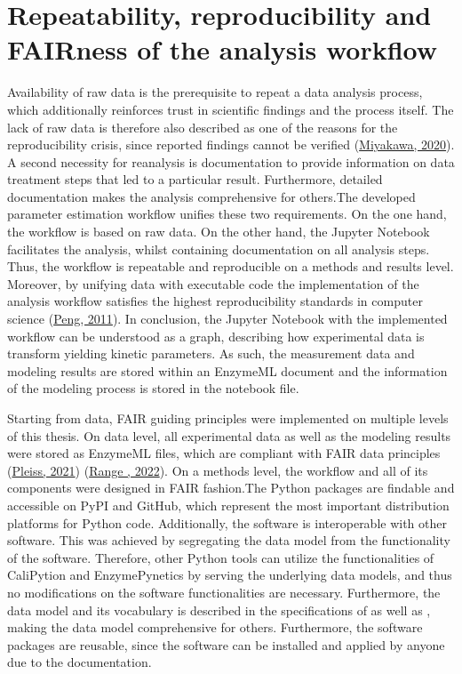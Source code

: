 \documentclass[letterpaper,12pt,english]{jupyterBook}
\begin{document}
\section{Repeatability, reproducibility and FAIRness of the analysis workflow}
\label{\detokenize{discussion:repeatability-reproducibility-and-fairness-of-the-analysis-workflow}}
\sphinxAtStartPar
Availability of raw data is the prerequisite to repeat a data analysis process, which additionally reinforces trust in scientific findings and the process itself. The lack of raw data is therefore also described as one of the reasons for the reproducibility crisis, since reported findings cannot be verified (\hyperlink{cite.references:id21}{Miyakawa, 2020}).
A second necessity for reanalysis is documentation to provide information on data treatment steps that led to a particular result. Furthermore, detailed documentation makes the analysis comprehensive for others.The developed parameter estimation workflow unifies these two requirements. On the one hand, the workflow is based on raw data. On the other hand, the Jupyter Notebook facilitates the analysis, whilst containing documentation on all analysis steps. Thus, the workflow is repeatable and reproducible on a methods and results level. Moreover, by unifying data with executable code the implementation of the analysis workflow satisfies the highest reproducibility standards in computer science (\hyperlink{cite.references:id22}{Peng, 2011}).
In conclusion, the Jupyter Notebook with the implemented workflow can be understood as a graph, describing how experimental data is transform yielding kinetic parameters. As such, the measurement data and modeling results are stored within an EnzymeML document and the information of the modeling process is stored in the notebook file.

\sphinxAtStartPar
Starting from data, FAIR guiding principles were implemented on multiple levels of this thesis. On data level, all experimental data as well as the modeling results were stored as EnzymeML files, which are compliant with FAIR data principles (\hyperlink{cite.references:id4}{Pleiss, 2021}) (\hyperlink{cite.references:id18}{Range , 2022}). On a methods level, the workflow and all of its components were designed in FAIR fashion.The Python packages are findable and accessible on PyPI and GitHub, which represent the most important distribution platforms for Python code. Additionally, the software is interoperable with other software. This was achieved by segregating the data model from the functionality of the software. Therefore, other Python tools can utilize the functionalities of CaliPytion and EnzymePynetics by serving the underlying data models, and thus no modifications on the software functionalities are necessary. Furthermore, the data model and its vocabulary is described in the specifications of  as well as , making the data model comprehensive for others. Furthermore, the software packages are reusable, since the software can be installed and applied by anyone due to the documentation.
\end{document}

